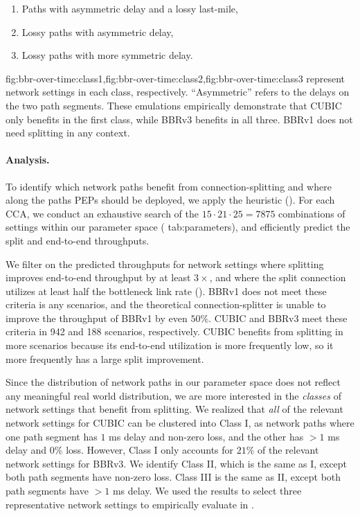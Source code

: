 \begin{enumerate}[label=\Roman*.,noitemsep]
\item Paths with asymmetric delay and a lossy last-mile,
\item Lossy paths with asymmetric delay,
\item Lossy paths with more symmetric delay.
\end{enumerate}

\noindent \Cref
 {fig:bbr-over-time:class1,fig:bbr-over-time:class2,fig:bbr-over-time:class3}
represent network settings in each class, respectively.
``Asymmetric'' refers to the delays on the two path segments.
These emulations empirically demonstrate that CUBIC only benefits in the first
class, while BBRv3 benefits in all three.
BBRv1 does not need splitting in any context.

\paragraph{Analysis.}
To identify which network paths benefit from connection-splitting and where
along the paths PEPs should be deployed, we apply the
heuristic ().
For each CCA, we conduct an exhaustive search of the $15 \cdot 21 \cdot 25 =
7875$ combinations of settings within our parameter space (\Cref
{tab:parameters}), and efficiently predict the split and end-to-end throughputs.

We filter on the predicted throughputs for network settings where splitting improves end-to-end throughput by
at least $3\times$, and where the split connection utilizes at least half the
bottleneck link rate (). BBRv1 does not meet
these criteria is any scenarios, and the theoretical connection-splitter is
unable to improve the throughput of BBRv1 by even $50\%$. CUBIC and BBRv3 meet
these criteria in 942 and 188 scenarios, respectively. CUBIC benefits from
splitting in more scenarios because its end-to-end utilization is more
frequently low, so it more frequently has a large split improvement.



Since the distribution of network paths in our parameter space does not reflect
any meaningful real world distribution, we are more interested in the \textit
{classes} of network settings that benefit from splitting. We realized
that \textit{all} of the relevant network settings for CUBIC can be clustered
into Class I, as network paths where one path segment has $1$ ms delay and
non-zero loss, and the other has $>1$ ms delay and $0\%$ loss. However, Class
I only accounts for $21\%$ of the relevant network settings for BBRv3. We
identify Class II, which is the same as I, except both path segments have
non-zero loss. Class III is the same as II, except both path segments have
$>1$ ms delay. We used the results to select three representative network
settings to empirically evaluate in .

